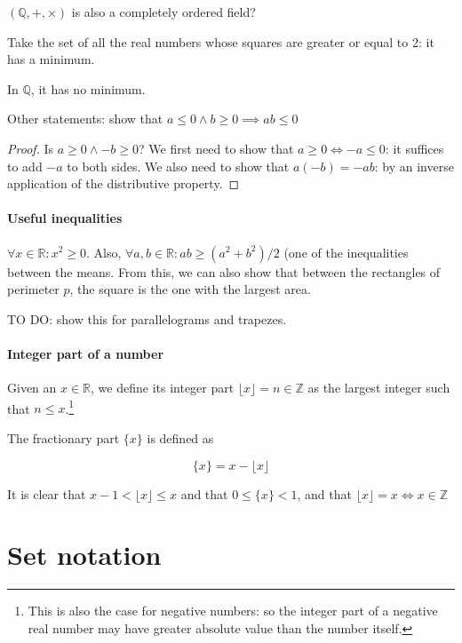 \documentclass[12pt,a4paper]{report}
\numberwithin{equation}{section}
\theoremstyle{definition}
\theoremstyle{remark}
\begin{document}
$(\mathbb{Q}, +, \times) $ is also a completely ordered field?

Take the set of all the real numbers whose squares are greater or equal to 2: it has a minimum.

In $\mathbb{Q}$, it has no minimum.

Other statements: show that $a \leq 0 \wedge b \geq 0 \implies ab \leq 0$

\begin{proof}
Is $a \geq 0 \wedge -b \geq 0$? We first need to show that $a \geq 0 \iff -a \leq 0$: it suffices to add $-a$ to both sides. We also need to show that $a (-b) = -ab$: by an inverse application of the distributive property.
\end{proof}

\paragraph{Useful inequalities}

$\forall x \in \mathbb{R}: x^2 \geq 0$. Also, $\forall a, b \in \mathbb{R}: ab \geq (a^2 + b^2)/2$ (one of the inequalities between the means. From this, we can also show that between the rectangles of perimeter $p$, the square is the one with the largest area.

TO DO: show this for parallelograms and trapezes.

\paragraph{Integer part of a number} Given an $x \in \mathbb{R}$, we define its integer part $\lfloor x \rfloor = n \in \mathbb{Z}$ as the largest integer such that $n\leq x$.\footnote{This is also the case for negative numbers: so the integer part of a negative real number may have greater absolute value than the number itself.}

The fractionary part $\lbrace x \rbrace$ is defined as

\begin{equation}
\lbrace x \rbrace = x - \lfloor x \rfloor
\end{equation}

It is clear that $x-1 < \lfloor x \rfloor \leq x$ and that $0 \leq \lbrace x \rbrace  < 1$, and that $\lfloor x \rfloor =x \iff x \in \mathbb{Z}$

\section{Set notation}
\end{document}
